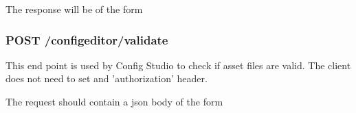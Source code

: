 \begin{Shaded}
\begin{Highlighting}[]
\FunctionTok{\{}
    \FunctionTok{:\{}
        \FunctionTok{:} \FunctionTok{\{}
            \FunctionTok{:} \FunctionTok{,}
            \FunctionTok{:} \FunctionTok{,}
            \FunctionTok{:} 
            \FunctionTok{\},}
        \FunctionTok{:} \FunctionTok{\{}
        \FunctionTok{:} \FunctionTok{,}
        \FunctionTok{:} 
        \FunctionTok{\},}
    \FunctionTok{\},}
    \FunctionTok{:} 
\FunctionTok{\}}
\end{Highlighting}
\end{Shaded}

The response will be of the form

\begin{Shaded}
\begin{Highlighting}[]
\FunctionTok{\{}
    \FunctionTok{:} \FunctionTok{,}
    \FunctionTok{:} \FunctionTok{,}
    \FunctionTok{:} 
\FunctionTok{\}}
\end{Highlighting}
\end{Shaded}

\hypertarget{post-configeditorvalidate}{%
\subsubsection{POST
/configeditor/validate}\label{post-configeditorvalidate}}

This end point is used by Config Studio to check if asset files are
valid. The client does not need to set and 'authorization' header.

The request should contain a json body of the form

\begin{Shaded}
\begin{Highlighting}[]
\FunctionTok{\{}
    \FunctionTok{:} \FunctionTok{,} 
\FunctionTok{\}}
\end{Highlighting}
\end{Shaded}


